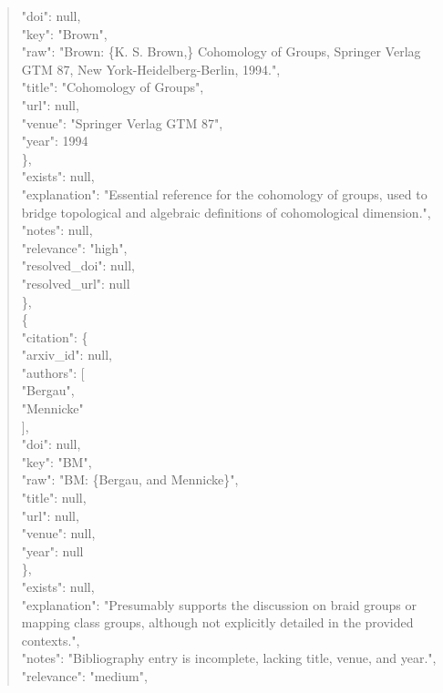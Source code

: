 \documentclass[11pt]{article}
\begin{document}
\begin{quote}
        "doi": null,\\
        "key": "Brown",\\
        "raw": "Brown: \{K. S. Brown,\} Cohomology of Groups, Springer Verlag GTM 87, New York-Heidelberg-Berlin, 1994.",\\
        "title": "Cohomology of Groups",\\
        "url": null,\\
        "venue": "Springer Verlag GTM 87",\\
        "year": 1994\\
      \},\\
      "exists": null,\\
      "explanation": "Essential reference for the cohomology of groups, used to bridge topological and algebraic definitions of cohomological dimension.",\\
      "notes": null,\\
      "relevance": "high",\\
      "resolved\_doi": null,\\
      "resolved\_url": null\\
    \},\\
    \{\\
      "citation": \{\\
        "arxiv\_id": null,\\
        "authors": [\\
          "Bergau",\\
          "Mennicke"\\
        ],\\
        "doi": null,\\
        "key": "BM",\\
        "raw": "BM: \{Bergau, and Mennicke\}",\\
        "title": null,\\
        "url": null,\\
        "venue": null,\\
        "year": null\\
      \},\\
      "exists": null,\\
      "explanation": "Presumably supports the discussion on braid groups or mapping class groups, although not explicitly detailed in the provided contexts.",\\
      "notes": "Bibliography entry is incomplete, lacking title, venue, and year.",\\
      "relevance": "medium",\\

\end{quote}
\end{document}
